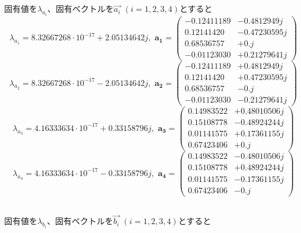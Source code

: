 \documentclass{jsarticle}
\begin{document}
\subsection{}
固有値を$\lambda_{a_{i}}$、固有ベクトルを$\vec{a_{i}}\,\,(i = 1,2,3,4)$とすると
\begin{equation*}
\lambda_{a_{1}} = 8.32667268\cdot10^{-17}+2.05134642j, \,\,
\bm{a_{1}} = \left(
    \begin{alignedat}{1}
      -0.12411189 &- 0.4812949j\\
      0.12141420 &- 0.47230595j\\
      0.68536757 &+ 0.j\\
      -0.01123030 &+ 0.21279641j
    \end{alignedat}
  \right)
\end{equation*}
\begin{equation*}
\lambda_{a_{2}} = 8.32667268\cdot10^{-17}-2.05134642j, \,\,
\bm{a_{2}} = \left(
    \begin{alignedat}{1}
      -0.12411189&+0.4812949j\\
      0.12141420&+0.47230595j\\
      0.68536757&-0.j\\
      -0.01123030&-0.21279641j
    \end{alignedat}
  \right)
\end{equation*}
\begin{equation*}
\lambda_{a_{3}} = 4.16333634\cdot10^{-17}+0.33158796j, \,\,
\bm{a_{3}} = \left(
    \begin{alignedat}{1}
      0.14983522&+0.48010506j\\
      0.15108778&-0.48924244j\\
      0.01141575&+0.17361155j\\
      0.67423406&+0.j
    \end{alignedat}
  \right)
\end{equation*}
\begin{equation*}
\lambda_{a_{4}} = 4.16333634\cdot10^{-17}-0.33158796j, \,\,
\bm{a_{4}} = \left(
    \begin{alignedat}{1}
      0.14983522&-0.48010506j\\
      0.15108778&+0.48924244j\\
      0.01141575&-0.17361155j\\
      0.67423406&-0.j 
    \end{alignedat}
  \right)
\end{equation*}

\subsection{}
固有値を$\lambda_{b_{i}}$、固有ベクトルを$\vec{b_{i}}\,\,(i = 1,2,3,4)$とすると
\end{document}
